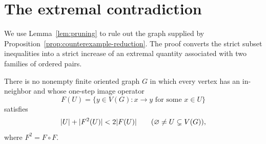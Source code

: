 \section{The extremal contradiction}\label{sec:incompatibility}

We use Lemma~\ref{lem:pruning} to rule out the graph supplied by
Proposition~\ref{prop:counterexample-reduction}.  The proof converts the strict
subset inequalities into a strict increase of an extremal quantity associated
with two families of ordered pairs.

\begin{proposition}\label{prop:no-concavity}
There is no nonempty finite oriented graph $G$ in which every vertex has an
in-neighbor and whose one-step image operator
\[
 F(U)=\{y\in V(G):x\to y\text{ for some }x\in U\}
\]
satisfies
\begin{equation}\label{eq:impossible-concavity}
 \lvert U\rvert+\lvert F^2(U)\rvert<2\lvert F(U)\rvert
 \qquad(\varnothing\ne U\subsetneq V(G)),
\end{equation}
where $F^2=F\circ F$.
\end{proposition}

